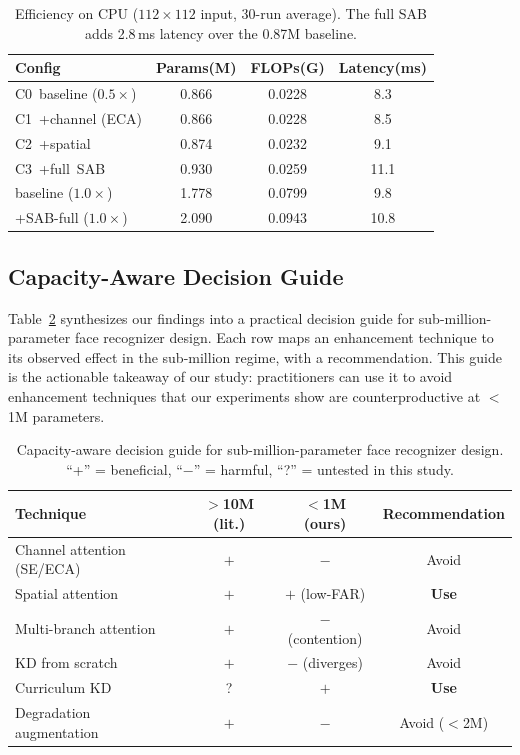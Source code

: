 \documentclass[journal,10pt]{IEEEtran}
\begin{document}
\begin{table}[h]
\centering
\caption{Efficiency on CPU ($112{\times}112$ input, 30-run average). The full SAB adds 2.8\,ms latency over the 0.87M baseline.}
\label{tab:eff}
\begin{tabular}{lccc}
\toprule
Config & Params(M) & FLOPs(G) & Latency(ms) \\
\midrule
C0~baseline ($0.5{\times}$)       & 0.866 & 0.0228 & 8.3 \\
C1~+channel (ECA)                 & 0.866 & 0.0228 & 8.5 \\
C2~+spatial                       & 0.874 & 0.0232 & 9.1 \\
C3~+full~SAB                      & 0.930 & 0.0259 & 11.1 \\
\midrule
baseline ($1.0{\times}$)          & 1.778 & 0.0799 & 9.8 \\
+SAB-full ($1.0{\times}$)         & 2.090 & 0.0943 & 10.8 \\
\bottomrule
\end{tabular}
\end{table}

\subsection{Capacity-Aware Decision Guide}
\label{sec:guide}

Table~\ref{tab:guide} synthesizes our findings into a practical decision guide for sub-million-parameter face recognizer design. Each row maps an enhancement technique to its observed effect in the sub-million regime, with a recommendation. This guide is the actionable takeaway of our study: practitioners can use it to avoid enhancement techniques that our experiments show are counterproductive at $<$1M parameters.

\begin{table}[h]
\centering
\caption{Capacity-aware decision guide for sub-million-parameter face recognizer design. ``+'' = beneficial, ``$-$'' = harmful, ``?'' = untested in this study.}
\label{tab:guide}
\begin{tabular}{lccc}
\toprule
Technique & $>$10M (lit.) & $<$1M (ours) & Recommendation \\
\midrule
Channel attention (SE/ECA)      & $+$ & $-$ & Avoid \\
Spatial attention               & $+$ & $+$ (low-FAR) & \textbf{Use} \\
Multi-branch attention          & $+$ & $-$ (contention) & Avoid \\
KD from scratch                 & $+$ & $-$ (diverges) & Avoid \\
Curriculum KD                   & ? & $+$ & \textbf{Use} \\
Degradation augmentation        & $+$ & $-$ & Avoid ($<$2M) \\
\bottomrule
\end{tabular}
\end{table}
\end{document}
